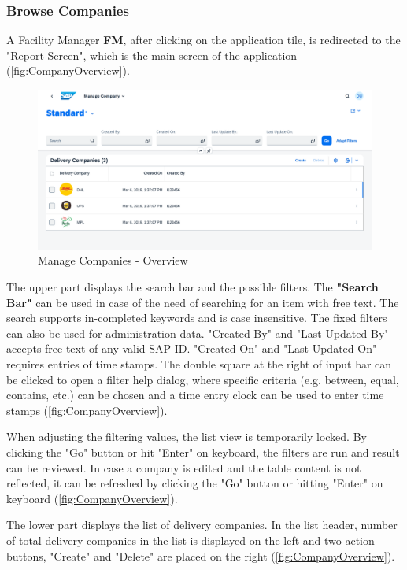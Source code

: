 \subsubsection{Browse Companies}
A Facility Manager \textbf{FM}, after clicking on the application tile, is redirected to the "Report Screen", which is the main screen of the application (\autoref{fig:CompanyOverview}). 

\begin{figure}[H]
	\centering
	\includegraphics[width=1\linewidth]{images/user_doc/company/report/overview.png}
	\caption{Manage Companies - Overview}
	\label{fig:CompanyOverview}
\end{figure}

The upper part displays the search bar and the possible filters. 
The \textbf{"Search Bar"} can be used in case of the need of searching for an item with free text. The search supports in-completed keywords and is case insensitive. The fixed filters can also be used for administration data. "Created By" and "Last Updated By" accepts free text of any valid SAP ID. "Created On" and "Last Updated On" requires entries of time stamps. The double square at the right of input bar can be clicked to open a filter help dialog, where specific criteria (e.g. between, equal, contains, etc.) can be chosen and a time entry clock can be used to enter time stamps (\autoref{fig:CompanyOverview}). 

When adjusting the filtering values, the list view is temporarily locked. By clicking the "Go" button or hit "Enter" on keyboard, the filters are run and result can be reviewed. In case a company is edited and the table content is not reflected, it can be refreshed by clicking the "Go" button or hitting "Enter" on keyboard (\autoref{fig:CompanyOverview}). 

The lower part displays the list of delivery companies. In the list header, number of total delivery companies in the list is displayed on the left and two action buttons, "Create" and "Delete" are placed on the right (\autoref{fig:CompanyOverview}). 

